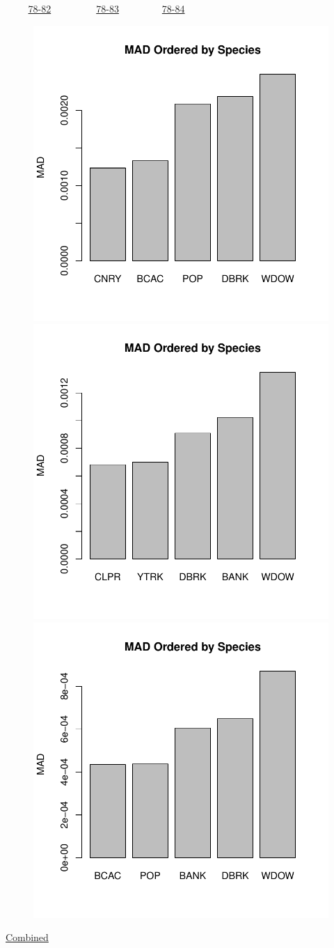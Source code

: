 \documentclass[ xcolor = pdftex, dvipsnames, table ]{beamer}
\begin{document}
\begin{frame}{$~~~~~~~~~$ \href{https://github.com/gasduster99/sppComp/tree/master/sscRuns/26919781982M4}{78-82} $~~~~~~~~~~~~~~~~~~$ \href{https://github.com/gasduster99/sppComp/tree/master/sscRuns/26919781983M4}{78-83} $~~~~~~~~~~~~~~~~~$ \href{https://github.com/gasduster99/sppComp/tree/master/sscRuns/26919781984M4}{78-84} }
        \begin{figure}[ht!]
        \centering
        \hspace*{-1cm}
        \includegraphics[width=.4\textwidth]{../sscRuns/26919781982M4/sppTailMad68.pdf}
        \includegraphics[width=.4\textwidth]{../sscRuns/26919781983M4/sppTailMad68.pdf}
        \includegraphics[width=.4\textwidth]{../sscRuns/26919781984M4/sppTailMad68.pdf}
        \end{figure}
	\vspace{-1cm}
	\begin{center}
	\Large
	\href{https://github.com/gasduster99/sppComp/tree/master/try1/postSSC/26919781982345M4}{Combined}
	\end{center}
\end{frame}
\end{document}
